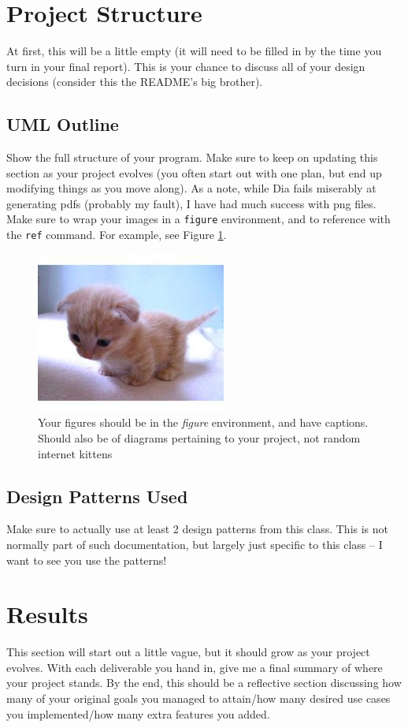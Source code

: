 \documentclass[10pt,conference,onecolumn,compsoc]{IEEEtran}
\begin{document}
\section{Project Structure}
At first, this will be a little empty (it will need to be filled in by the time you turn in your final report).  This is your chance to discuss all of your design decisions (consider this the README's big brother).

\subsection{UML Outline}
Show the full structure of your program.  Make sure to keep on updating this section as your project evolves (you often start out with one plan, but end up modifying things as you move along).  As a note, while Dia fails miserably at generating pdfs (probably my fault), I have had much success with png files.  Make sure to wrap your images in a \texttt{figure} environment, and to reference with the \texttt{ref} command.  For example, see Figure \ref{cat2}.

\begin{figure}[ht!]
\includegraphics[scale=1.5]{cat2.jpg}
\caption{Your figures should be in the \emph{figure} environment, and have captions.  Should also be of diagrams pertaining to your project, not random internet kittens}
\label{cat2}
\end{figure}


\subsection{Design Patterns Used}
Make sure to actually use at least 2 design patterns from this class.  This is not normally part of such documentation, but largely just specific to this class -- I want to see you use the patterns!


\section{Results}
This section will start out a little vague, but it should grow as your project evolves.  With each deliverable you hand in, give me a final summary of where your project stands.  By the end, this should be a reflective section discussing how many of your original goals you managed to attain/how many desired use cases you implemented/how many extra features you added.
\end{document}
